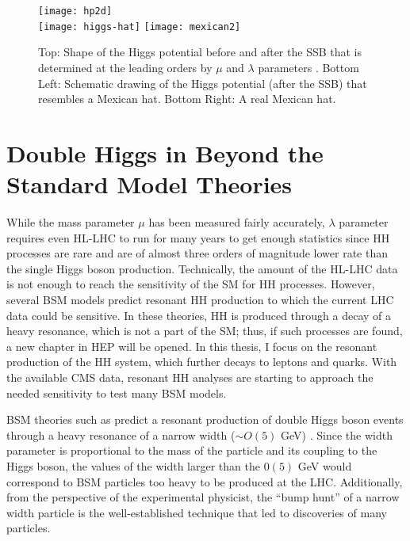 \begin{figure}[H]
\centering
\texttt{[image: hp2d]}\\
\hspace{1cm} \texttt{[image: higgs-hat]}
\texttt{[image: mexican2]}\\
\caption[SSB Potential form]{Top: Shape of the Higgs potential before and after the SSB that is determined at the leading orders by $\mu$ and $\lambda$ parameters \cite{MonroyMontanez:2639240}. Bottom Left: Schematic drawing of the Higgs potential (after the SSB) that resembles a Mexican hat. Bottom Right: A real Mexican hat.}
\label{hp2d}
\end{figure}


\section{Double Higgs in Beyond the Standard Model Theories}

While the mass parameter $\mu$ has been measured fairly accurately, $\lambda$ parameter requires even HL-LHC to run for many years to get enough statistics since HH processes are rare and are of almost three orders of magnitude lower rate than the single Higgs boson production. Technically, the amount of the HL-LHC data is not enough to reach the sensitivity of the SM for HH processes. However, several BSM models predict resonant HH production to which the current LHC data could be sensitive. In these theories, HH is produced through a decay of a heavy resonance, which is not a part of the SM; thus, if such processes are found, a new chapter in HEP will be opened. In this thesis, I focus on the resonant production of the HH system, which further decays to leptons and quarks. With the available CMS data, resonant HH analyses are starting to approach the needed sensitivity to test many BSM models. 

BSM theories such as \cite{Huang:2017nnw, Dolan:2012ac, Kanemura:2016tan, Sirunyan:2018iwt, Randall:1999ee, Oliveira:2014kla} predict a resonant production of double Higgs boson events through a heavy resonance of a narrow width ($\sim O(5)$ GeV) \cite{Sirunyan:2018iwt}. Since the width parameter is proportional to the mass of the particle and its coupling to the Higgs boson, the values of the width larger than the $0(5)$ GeV would correspond to BSM particles too heavy to be produced at the LHC. Additionally, from the perspective of the experimental physicist, the ``bump hunt'' of a narrow width particle is the well-established technique that led to discoveries of many particles. 


